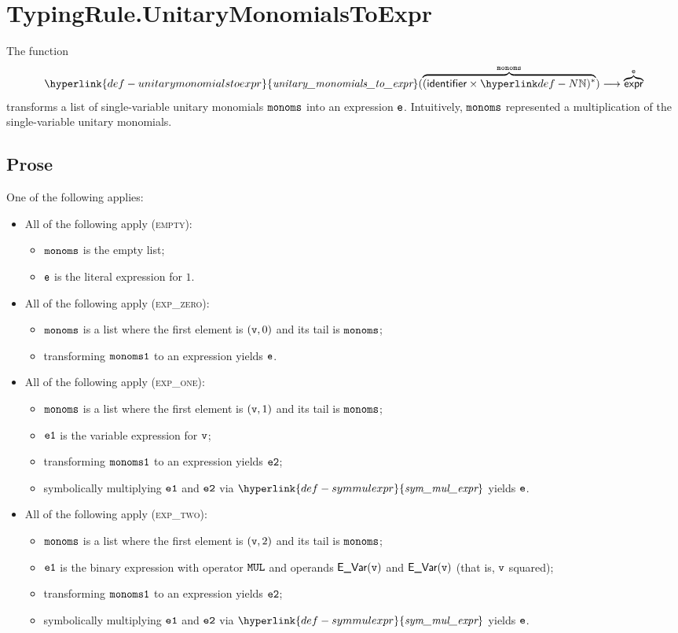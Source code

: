 \documentclass{book}
\newcommand\symmulexpr[0]{\hyperlink{def-symmulexpr}{\textfunc{sym\_mul\_expr}}}
\newcommand\unitarymonomialstoexpr[0]{\hyperlink{def-unitarymonomialstoexpr}{\textfunc{unitary\_monomials\_to\_expr}}}
\begin{document}
\section{TypingRule.UnitaryMonomialsToExpr \label{sec:TypingRule.UnitaryMonomialsToExpr}}
\hypertarget{def-unitarymonomialstoexpr}{}
The function
\[
\unitarymonomialstoexpr(\overname{(\identifier\times\N)^*}{\monoms}) \aslto \overname{\expr}{\ve}
\]
transforms a list of single-variable unitary monomials $\texttt{monoms}$ into an expression $\texttt{e}$.
Intuitively, $\texttt{monoms}$ represented a multiplication of the single-variable unitary monomials.

\subsection{Prose}
One of the following applies:
\begin{itemize}
  \item All of the following apply (\textsc{empty}):
  \begin{itemize}
    \item $\texttt{monoms}$ is the empty list;
    \item $\texttt{e}$ is the literal expression for $1$.
  \end{itemize}

  \item All of the following apply (\textsc{exp\_zero}):
  \begin{itemize}
    \item $\texttt{monoms}$ is a list where the first element is $(\texttt{v}, 0)$ and its tail is $\texttt{monoms}$;
    \item transforming $\texttt{monoms1}$ to an expression yields $\texttt{e}$.
  \end{itemize}

  \item All of the following apply (\textsc{exp\_one}):
  \begin{itemize}
    \item $\texttt{monoms}$ is a list where the first element is $(\texttt{v}, 1)$ and its tail is $\texttt{monoms}$;
    \item $\texttt{e1}$ is the variable expression for $\texttt{v}$;
    \item transforming $\texttt{monoms1}$ to an expression yields $\texttt{e2}$;
    \item symbolically multiplying $\texttt{e1}$ and $\texttt{e2}$ via $\symmulexpr$ yields $\texttt{e}$.
  \end{itemize}

  \item All of the following apply (\textsc{exp\_two}):
  \begin{itemize}
    \item $\texttt{monoms}$ is a list where the first element is $(\texttt{v}, 2)$ and its tail is $\texttt{monoms}$;
    \item $\texttt{e1}$ is the binary expression with operator $\texttt{MUL}$ and operands $\textsf{E\_Var}(\texttt{v})$ and $\textsf{E\_Var}(\texttt{v})$
          (that is, $\texttt{v}$ squared);
    \item transforming $\texttt{monoms1}$ to an expression yields $\texttt{e2}$;
    \item symbolically multiplying $\texttt{e1}$ and $\texttt{e2}$ via $\symmulexpr$ yields $\texttt{e}$.
  \end{itemize}


\end{itemize}
\end{document}
